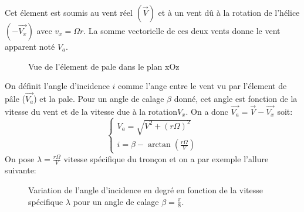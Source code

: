 \documentclass[main.tex]{subfiles}
\begin{document}
Cet élement est soumis au vent réel $(\vec{V})$ et à un vent dû à la rotation de l'hélice $(-\vec{V_{x}})$ avec $v_x =\Omega r$. La somme vectorielle de ces deux vents donne le vent apparent noté $V_a$.
\begin{figure}[H]
  \centering
  \caption{Vue de l'élement de pale dans le plan xOz}
\end{figure}
On définit l'angle d'incidence $i$ comme l'ange entre le vent vu par l'élement de pâle ($\vec{V_a}$) et la pale. Pour un angle de calage $\beta$ donné, cet angle est fonction de la vitesse du vent et de la vitesse due à la rotation$V_x$.
On a  donc $\vec{V_a} = \vec{V}-\vec{V_x} $ soit:
\[
  \begin{cases}
    V_a = \sqrt{V^2+(r\Omega)^2}\\
    i = \beta - \arctan\left(\frac{r\Omega}{V}\right)
  \end{cases}
\]
On pose $\lambda = \frac{r\Omega}{V}$ vitesse spécifique du tronçon et on a par exemple l'allure suivante:
\begin{figure}[H]
  \centering
  \caption{Variation de l'angle d'incidence en degré en fonction de la vitesse spécifique $\lambda$ pour un angle de calage $\beta =\frac{\pi}{8}$.}
  \label{fig:ploti}
\end{figure}
\end{document}
